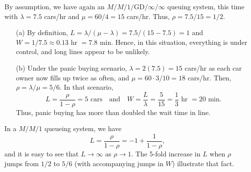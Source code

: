 By assumption, we have again an $M/M/1/\textrm{GD}/\infty/\infty$ queuing system, this time with $\lambda = 7.5$ cars/hr and $\mu = 60/4 = 15$ cars/hr.  Thus, $\rho = 7.5/15 = 1/2$.
\begin{enumerate}[noitemsep]
	\item[(a)] By definition, $L = \lambda/(\mu - \lambda) = 7.5/(15-7.5) = 1$ and $W = 1/7.5 \approx 0.13$ hr $=7.8$ min. Hence, in this situation, everything is under control, and long lines appear to be unlikely.
\item[(b)] Under the panic buying scenario,  $\lambda = 2(7.5)=15$ cars/hr as each car owner now fills up twice as often, and $\mu = 60 \cdot 3 /10  = 18$ cars/hr.  Then, $\rho = \lambda/\mu = 5/6$. In that scenario,  
$$ L = \frac{\rho}{1-\rho} = 5 \text{ cars}\quad \mbox{and}\quad W = \frac{L}{\lambda} = \frac{5}{15} = \frac{1}{3} \text{ hr } = 20 \text{ min}.$$
Thus, panic buying has more than doubled the wait time in line.
\end{enumerate}
In a $M/M/1$ queueing system, we have $$L=\frac{\rho}{1-\rho}=-1+\frac{1}{1-\rho}, $$ and it is easy to see that $L\to\infty$ as $\rho\to 1$. The 5-fold increase in $L$ when $\rho$ jumps from $1/2$ to $5/6$ (with accompanying jumps in $W$) illustrate that fact. 
